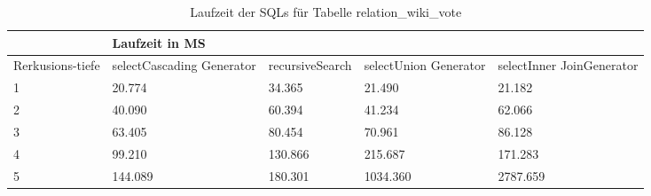 \begin{table}[H]
	\begin{tabular}{l|l|l|l|l|l|}
		\cline{2-6}
		& \multicolumn{5}{|l|}{Laufzeit in MS}                                                                                                                                                  \\ \hline
		\multicolumn{1}{|l|}{\multirow{2}{2cm}{Rerkusions-tiefe}} & \multicolumn{2}{|l|}{\multirow{2}{3cm}{selectCascading Generator}} & \multirow{2}{2.8cm}{recursiveSearch} & \multirow{2}{2.5cm}{selectUnion Generator} & \multirow{2}{2.5cm}{selectInner JoinGenerator} \\
		\multicolumn{1}{|l|}{}
		& \multicolumn{2}{|l|}{}                                           &                                  &                                     &                                           \\ \hline
		
		\multicolumn{1}{|l|}{1}                                 & \multicolumn{2}{l|}{20.774}                                      & 34.365                                                & 21.490                                                    & 21.182                                                          \\ \hline
		\multicolumn{1}{|l|}{2}                                 & \multicolumn{2}{l|}{40.090}                                      & 60.394                                                & 41.234                                                    & 62.066                                                          \\ \hline
		\multicolumn{1}{|l|}{3}                                 & \multicolumn{2}{l|}{63.405}                                      & 80.454                                                & 70.961                                                    & 86.128                                                          \\ \hline
		\multicolumn{1}{|l|}{4}                                 & \multicolumn{2}{l|}{99.210}                                      & 130.866                                               & 215.687                                                   & 171.283                                                         \\ \hline
		\multicolumn{1}{|l|}{5}                                 & \multicolumn{2}{l|}{144.089}                                     & 180.301                                               & 1034.360                                                  & 2787.659                                                        \\ \hline
		
		
		
	\end{tabular}
	\caption{Laufzeit der SQLs für Tabelle relation\_wiki\_vote}
	\label{2.relationwikivote.table}
\end{table}

